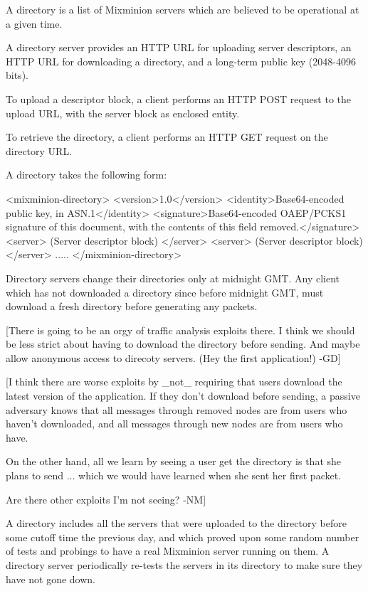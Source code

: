 A directory is a list of Mixminion servers which are believed to
be operational at a given time.

A directory server provides an HTTP URL for uploading server
descriptors, an HTTP URL for downloading a directory, and a long-term
public key (2048-4096 bits).

To upload a descriptor block, a client performs an HTTP POST request
to the upload URL, with the server block as enclosed entity.

To retrieve the directory, a client performs an HTTP GET request on
the directory URL.

A directory takes the following form:

<mixminion-directory>
  <version>1.0</version>
  <identity>Base64-encoded public key, in ASN.1</identity>
  <signature>Base64-encoded OAEP/PCKS1 signature of this document, with
     the contents of this field removed.</signature>
  <server>
     (Server descriptor block)
  </server>
  <server>
     (Server descriptor block)
  </server>
   .....
</mixminion-directory>

Directory servers change their directories only at midnight GMT.  Any
client which has not downloaded a directory since before midnight GMT,
must download a fresh directory before generating any packets.

[There is going to be an orgy of traffic analysis exploits there. I
think we should be less strict about having to download the directory
before sending. And maybe allow anonymous access to direcoty
servers. (Hey the first application!) -GD]

[I think there are worse exploits by _not_ requiring that users
download the latest version of the application.  If they don't
download before sending, a passive adversary knows that all messages
through removed nodes are from users who haven't downloaded, and all
messages through new nodes are from users who have.  

On the other hand, all we learn by seeing a user get the directory is
that she plans to send ... which we would have learned when she sent
her first packet.

Are there other exploits I'm not seeing? -NM]

A directory includes all the servers that were uploaded to the
directory before some cutoff time the previous day, and which proved
upon some random number of tests and probings to have a real Mixminion
server running on them.  A directory server periodically re-tests
the servers in its directory to make sure they have not gone down.

